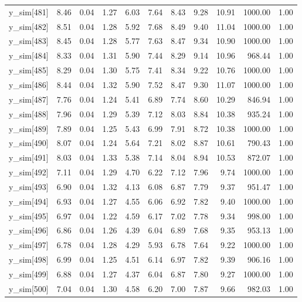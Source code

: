 \begin{table}[ht]
\begin{tabular}{rrrrrrrrrrr}
  y\_sim[481] & 8.46 & 0.04 & 1.27 & 6.03 & 7.64 & 8.43 & 9.28 & 10.91 & 1000.00 & 1.00 \\ 
  y\_sim[482] & 8.51 & 0.04 & 1.28 & 5.92 & 7.68 & 8.49 & 9.40 & 11.04 & 1000.00 & 1.00 \\ 
  y\_sim[483] & 8.45 & 0.04 & 1.28 & 5.77 & 7.63 & 8.47 & 9.34 & 10.90 & 1000.00 & 1.00 \\ 
  y\_sim[484] & 8.33 & 0.04 & 1.31 & 5.90 & 7.44 & 8.29 & 9.14 & 10.96 & 968.44 & 1.00 \\ 
  y\_sim[485] & 8.29 & 0.04 & 1.30 & 5.75 & 7.41 & 8.34 & 9.22 & 10.76 & 1000.00 & 1.00 \\ 
  y\_sim[486] & 8.44 & 0.04 & 1.32 & 5.90 & 7.52 & 8.47 & 9.30 & 11.07 & 1000.00 & 1.00 \\ 
  y\_sim[487] & 7.76 & 0.04 & 1.24 & 5.41 & 6.89 & 7.74 & 8.60 & 10.29 & 846.94 & 1.00 \\ 
  y\_sim[488] & 7.96 & 0.04 & 1.29 & 5.39 & 7.12 & 8.03 & 8.84 & 10.38 & 935.24 & 1.00 \\ 
  y\_sim[489] & 7.89 & 0.04 & 1.25 & 5.43 & 6.99 & 7.91 & 8.72 & 10.38 & 1000.00 & 1.00 \\ 
  y\_sim[490] & 8.07 & 0.04 & 1.24 & 5.64 & 7.21 & 8.02 & 8.87 & 10.61 & 790.43 & 1.00 \\ 
  y\_sim[491] & 8.03 & 0.04 & 1.33 & 5.38 & 7.14 & 8.04 & 8.94 & 10.53 & 872.07 & 1.00 \\ 
  y\_sim[492] & 7.11 & 0.04 & 1.29 & 4.70 & 6.22 & 7.12 & 7.96 & 9.74 & 1000.00 & 1.00 \\ 
  y\_sim[493] & 6.90 & 0.04 & 1.32 & 4.13 & 6.08 & 6.87 & 7.79 & 9.37 & 951.47 & 1.00 \\ 
  y\_sim[494] & 6.93 & 0.04 & 1.27 & 4.55 & 6.06 & 6.92 & 7.82 & 9.40 & 1000.00 & 1.00 \\ 
  y\_sim[495] & 6.97 & 0.04 & 1.22 & 4.59 & 6.17 & 7.02 & 7.78 & 9.34 & 998.00 & 1.00 \\ 
  y\_sim[496] & 6.86 & 0.04 & 1.26 & 4.39 & 6.04 & 6.89 & 7.68 & 9.35 & 953.13 & 1.00 \\ 
  y\_sim[497] & 6.78 & 0.04 & 1.28 & 4.29 & 5.93 & 6.78 & 7.64 & 9.22 & 1000.00 & 1.00 \\ 
  y\_sim[498] & 6.99 & 0.04 & 1.25 & 4.51 & 6.14 & 6.97 & 7.82 & 9.39 & 906.16 & 1.00 \\ 
  y\_sim[499] & 6.88 & 0.04 & 1.27 & 4.37 & 6.04 & 6.87 & 7.80 & 9.27 & 1000.00 & 1.00 \\ 
  y\_sim[500] & 7.04 & 0.04 & 1.30 & 4.58 & 6.20 & 7.00 & 7.87 & 9.66 & 982.03 & 1.00 \\ 

\end{tabular}
\end{table}
